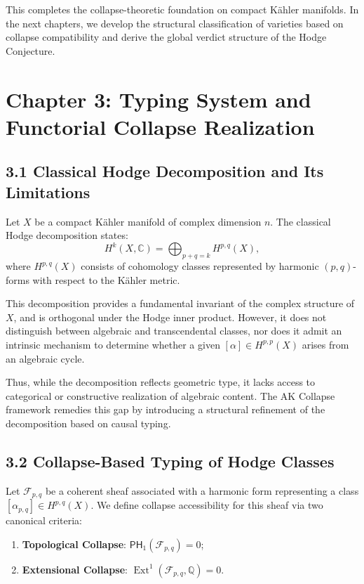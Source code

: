 \documentclass[11pt]{article}
\DeclareMathOperator{\Ext}{Ext}
\begin{document}
\bigskip

This completes the collapse-theoretic foundation on compact Kähler manifolds. In the next chapters, we develop the structural classification of varieties based on collapse compatibility and derive the global verdict structure of the Hodge Conjecture.




\section{Chapter 3: Typing System and Functorial Collapse Realization}

\subsection{3.1 Classical Hodge Decomposition and Its Limitations}

Let $X$ be a compact Kähler manifold of complex dimension $n$. The classical Hodge decomposition states:
\[
H^k(X, \mathbb{C}) = \bigoplus_{p+q=k} H^{p,q}(X),
\]
where $H^{p,q}(X)$ consists of cohomology classes represented by harmonic $(p,q)$-forms with respect to the Kähler metric.

This decomposition provides a fundamental invariant of the complex structure of $X$, and is orthogonal under the Hodge inner product. However, it does not distinguish between algebraic and transcendental classes, nor does it admit an intrinsic mechanism to determine whether a given $[\alpha] \in H^{p,p}(X)$ arises from an algebraic cycle.

Thus, while the decomposition reflects geometric type, it lacks access to categorical or constructive realization of algebraic content. The AK Collapse framework remedies this gap by introducing a structural refinement of the decomposition based on causal typing.

\subsection{3.2 Collapse-Based Typing of Hodge Classes}

Let $\mathcal{F}_{p,q}$ be a coherent sheaf associated with a harmonic form representing a class $[\alpha_{p,q}] \in H^{p,q}(X)$. We define collapse accessibility for this sheaf via two canonical criteria:

\begin{enumerate}
  \item \textbf{Topological Collapse}: $\mathsf{PH}_1(\mathcal{F}_{p,q}) = 0$;
  \item \textbf{Extensional Collapse}: $\Ext^1(\mathcal{F}_{p,q}, \mathbb{Q}) = 0$.
\end{enumerate}
\end{document}
